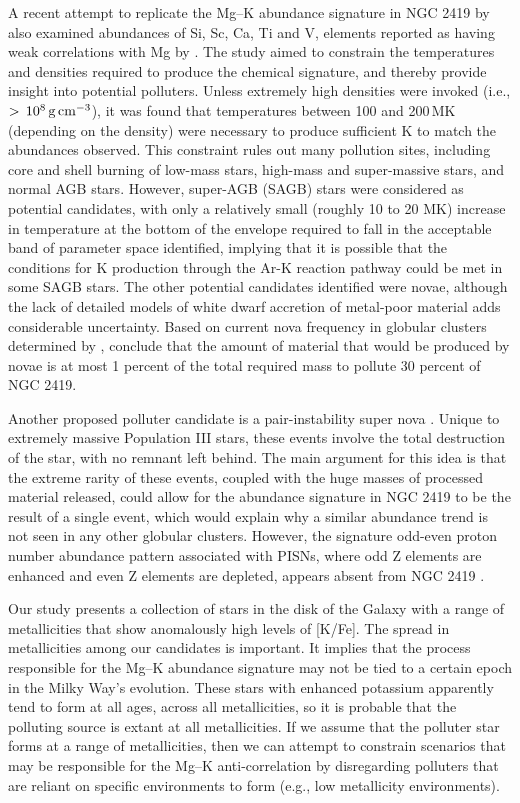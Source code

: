 \documentclass[a4paper,fleqn,usenatbib]{mnras}
\begin{document}
A recent attempt to replicate the Mg--K abundance signature in NGC 2419 by \cite{iliadis2016} also examined abundances of Si, Sc, Ca, Ti and V, elements reported as having weak correlations with Mg by \cite{cohenkirby2012}. The study aimed to constrain the temperatures and densities required to produce the chemical signature, and thereby provide insight into potential polluters.
Unless extremely high densities were invoked (i.e., $>\,10^8\,{\rm g\,cm}^{-3}$), it was found that temperatures between 100 and 200\,MK (depending on the density) were necessary to produce sufficient K to match the abundances observed. This constraint rules out many pollution sites, including core and shell burning of low-mass stars, high-mass and super-massive stars, and normal AGB stars. However, super-AGB (SAGB) stars were considered as potential candidates, with only a relatively small (roughly 10 to 20 MK) increase in temperature at the bottom of the envelope required to fall in the acceptable band of parameter space identified, implying that it is possible that the conditions for K production through the Ar-K reaction pathway could be met in some SAGB stars. The other potential candidates identified were novae, although the lack of detailed models of white dwarf accretion of metal-poor material adds considerable uncertainty. Based on current nova frequency in globular clusters determined by \cite{kato2013novae}, \cite{iliadis2016} conclude that the amount of material that would be produced by novae is at most 1 percent of the total required mass to pollute 30 percent of NGC 2419.

Another proposed  polluter candidate is a pair-instability super nova \citep[PISN;][]{carretta2013}. Unique to extremely massive Population III stars, these events involve the total destruction of the star, with no remnant left behind. The main argument for this idea is that the extreme rarity of these events, coupled with the huge masses of processed material released, could allow for the abundance signature in NGC 2419 to be the result of a single event, which would explain why a similar abundance trend is not seen in any other globular clusters. However, the signature odd-even proton number abundance pattern associated with PISNs, where odd Z elements are enhanced and even Z elements are depleted, appears absent from NGC 2419 \citep{carretta2013, cohenkirby2012}.

Our study presents a collection of stars in the disk of the Galaxy with a range of metallicities that show anomalously high levels of [K/Fe]. The spread in metallicities among our candidates is important. It implies that the process responsible for the Mg--K abundance signature may not be tied to a certain epoch in the Milky Way's evolution. These stars with enhanced potassium apparently tend to form at all ages, across all metallicities, so it is probable that the polluting source is extant at all metallicities. If we assume that the polluter star forms at a range of metallicities, then we can attempt to constrain scenarios that may be responsible for the Mg--K anti-correlation by disregarding polluters that are reliant on specific environments to form (e.g., low metallicity environments).
\end{document}
